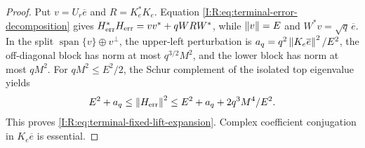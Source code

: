 \begin{proof}
Put $v=U_r\overline e$ and $R=K_e^*K_e$.  Equation
\eqref{I:R:eq:terminal-error-decomposition} gives
$H_{\rm err}^*H_{\rm err}=vv^*+qWRW^*$, while
$\left\lVert v\right\rVert=E$ and $W^*v=\sqrt q\,\overline e$.
In the split $\operatorname{span}\{v\}\oplus v^\perp$, the
upper-left perturbation is
$a_q=q^2\left\lVert K_e\overline e\right\rVert^2/E^2$, the off-diagonal block has
norm at most $q^{3/2}M^2$, and the lower block has norm at most $qM^2$.
For $qM^2\le E^2/2$, the Schur complement of the isolated top
eigenvalue yields
\[
 E^2+a_q\le\left\lVert H_{\rm err}\right\rVert^2
 \le E^2+a_q+2q^3M^4/E^2.
\]
This proves \eqref{I:R:eq:terminal-fixed-lift-expansion}.  Complex
coefficient conjugation in $K_e\overline e$ is essential.
\end{proof}
